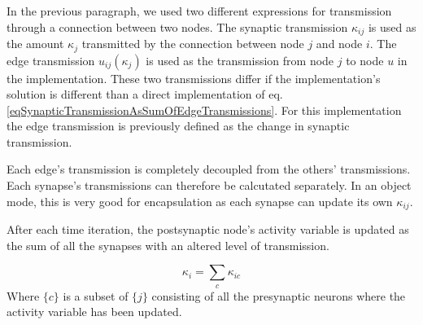 			In the previous paragraph, we used two 		 different expressions for transmission through a connection between two nodes. 
			The synaptic transmission $\kappa_{ij}$ is used as the amount $\kappa_j$ transmitted by the connection between node $j$ and node $i$. 
			The edge transmission $u_{ij}(\kappa_j)$ is used as the transmission from node $j$ to node $u$ in the implementation. 
			These two transmissions differ if the implementation's solution is different than a direct implementation of eq. \eqref{eqSynapticTransmissionAsSumOfEdgeTransmissions}.
			For this implementation the edge transmission is previously defined as the change in synaptic transmission. 


			Each edge's transmission is completely decoupled from the others' transmissions.
			Each synapse's transmissions can therefore be calcutated separately.
			In an object mode, this is very good for encapsulation as each synapse can update its own $\kappa_{ij}$.

			After each time iteration, the postsynaptic node's activity variable is updated as the sum of all the synapses with an altered level of transmission.

			\begin{equation}
				\kappa_i = \sum_c{\kappa_{ic}}
				\label{eqSynapticTransmissionForKANNimplementation}
			\end{equation}
			Where $\{c\}$ is a subset of $\{j\}$ consisting of all the presynaptic neurons where the activity variable has been updated.


